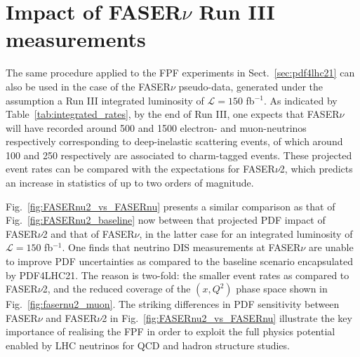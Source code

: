 \clearpage
\section{Impact of FASER$\nu$ Run III measurements}
\label{app:fasernu_runIII_impact}

The same procedure applied to the FPF experiments in Sect.~\ref{sec:pdf4lhc21}
can also be used in the case of the FASER$\nu$ pseudo-data, generated under the
assumption a Run III integrated
luminosity of $\mathcal{L}=150$ fb$^{-1}$.
%
As indicated by Table~\ref{tab:integrated_rates}, by the end of Run III, one expects
that FASER$\nu$ will have recorded around 500 and 1500 electron- and muon-neutrinos
respectively corresponding to deep-inelastic scattering events, of which around 100
and 250 respectively are associated to charm-tagged events.
%
These projected event rates can be compared with the expectations
for FASER$\nu$2, which predicts an increase in statistics of up to two orders
of magnitude.

Fig.~\ref{fig:FASERnu2_vs_FASERnu} presents a similar comparison as that of
Fig.~\ref{fig:FASERnu2_baseline} now between that projected PDF impact of FASER$\nu$2 and that of
FASER$\nu$, in the latter
case for an integrated luminosity of $\mathcal{L}=150$ fb$^{-1}$.
%
One finds that neutrino DIS measurements at FASER$\nu$ are unable to improve
PDF uncertainties as compared to the baseline scenario encapsulated by PDF4LHC21.
%
The reason is two-fold: the smaller event rates as compared to FASER$\nu$2,
and the reduced coverage of the $(x,Q^2)$ phase space shown in Fig.~\ref{fig:fasernu2_muon}.
%
The striking differences in PDF sensitivity between FASER$\nu$ and FASER$\nu$2 in
Fig.~\ref{fig:FASERnu2_vs_FASERnu} illustrate
the key importance of realising the FPF in order to exploit the full physics potential enabled 
by LHC neutrinos for QCD and hadron structure studies.

